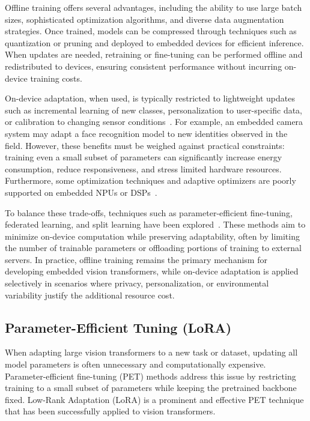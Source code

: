 \documentclass[runningheads,a4paper]{llncs}
\begin{document}
Offline training offers several advantages, including the ability to use large batch sizes, sophisticated optimization algorithms, and diverse data augmentation strategies. Once trained, models can be compressed through techniques such as quantization or pruning and deployed to embedded devices for efficient inference. When updates are needed, retraining or fine-tuning can be performed offline and redistributed to devices, ensuring consistent performance without incurring on-device training costs.

On-device adaptation, when used, is typically restricted to lightweight updates such as incremental learning of new classes, personalization to user-specific data, or calibration to changing sensor conditions~\cite{nadalini2025odl_tiny,mlsys2023ondevice_chapter}. For example, an embedded camera system may adapt a face recognition model to new identities observed in the field. However, these benefits must be weighed against practical constraints: training even a small subset of parameters can significantly increase energy consumption, reduce responsiveness, and stress limited hardware resources. Furthermore, some optimization techniques and adaptive optimizers are poorly supported on embedded NPUs or DSPs~\cite{mlsys2023ondevice_chapter}.

To balance these trade-offs, techniques such as parameter-efficient fine-tuning, federated learning, and split learning have been explored~\cite{houlsby2019adapter,mlsys2023ondevice_chapter}. These methods aim to minimize on-device computation while preserving adaptability, often by limiting the number of trainable parameters or offloading portions of training to external servers. In practice, offline training remains the primary mechanism for developing embedded vision transformers, while on-device adaptation is applied selectively in scenarios where privacy, personalization, or environmental variability justify the additional resource cost.

\subsection{Parameter-Efficient Tuning (LoRA)}
When adapting large vision transformers to a new task or dataset, updating all model parameters is often unnecessary and computationally expensive. Parameter-efficient fine-tuning (PET) methods address this issue by restricting training to a small subset of parameters while keeping the pretrained backbone fixed. Low-Rank Adaptation (LoRA) is a prominent and effective PET technique that has been successfully applied to vision transformers.
\end{document}
